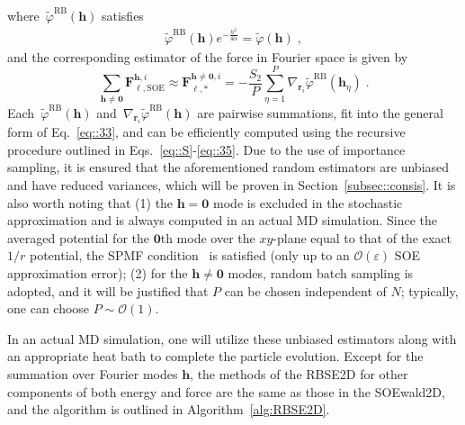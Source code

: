 where~$\widetilde{\varphi}^{\text{RB}}({\bm{h}})$ satisfies
\begin{equation}
	\begin{split}
		\widetilde{\varphi}^{\text{RB}}({\bm{h}}) e^{ - \frac{h^2}{4\alpha}} = \widetilde{\varphi}({\bm{h}}) \;,
	\end{split}
\end{equation}
and the corresponding estimator of the force in Fourier space is given by
\begin{equation}
	\sum_{\bm{h}\neq\bm{0}}\bm{F}_{\ell,\text{SOE}}^{\bm{h},i}\approx \bm{F}_{\ell,*}^{\bm{h}\neq\bm{0},i}=-\frac{S_2}{P} \sum_{\eta=1}^{P}\nabla_{\bm{r}_{i}}\widetilde{\varphi}^{\text{RB}}(\bm{h}_{\eta})\;.
\end{equation}
Each~$\widetilde{\varphi}^{\text{RB}}({\bm{h}})$ and~$\nabla_{\bm{r}_{i}}\widetilde{\varphi}^{\text{RB}}(\bm{h})$ are pairwise summations, fit into the general form of Eq.~\eqref{eq::33}, and can be efficiently computed using the recursive procedure outlined in Eqs.~\eqref{eq::S}-\eqref{eq::35}. 
Due to the use of importance sampling, it is ensured that the aforementioned random estimators are unbiased and have reduced variances, which will be proven in Section~\ref{subsec::consis}.
It is also worth noting that (1) the $\bm h=\bm 0$ mode is excluded in the stochastic approximation and is always computed in an actual MD simulation. Since the averaged potential for the $\bm 0$th mode over the $xy$-plane equal to that of the exact $1/r$ potential, the SPMF condition~\cite{hu2014symmetry} is satisfied (only up to an $\mathcal O(\varepsilon)$ SOE approximation error); (2) for the  $\bm h\neq \bm 0$ modes, random batch sampling is adopted, and it will be justified that $P$ can be chosen independent of $N$; typically, one can choose $P\sim \mathcal O(1)$.


In an actual MD simulation, one will utilize these unbiased estimators along with an appropriate heat bath to complete the particle evolution.  
Except for the summation over Fourier modes $\bm{h}$, the methods of the RBSE2D for other components of both energy and force are the same as those in the SOEwald2D, and the algorithm is outlined in Algorithm~\ref{alg:RBSE2D}.

